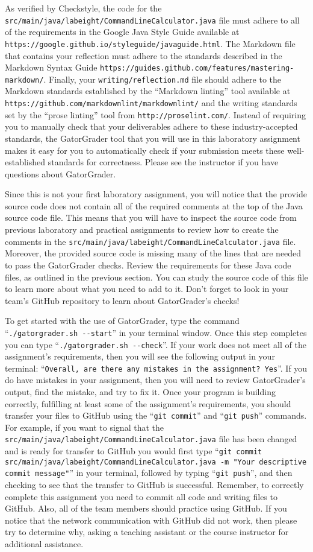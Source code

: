 \documentclass[11pt]{article}
\newcommand{\mainprogramsource}{\lstinline{src/main/java/labeight/CommandLineCalculator.java}}
\newcommand{\reflection}{\lstinline{writing/reflection.md}}
\newcommand{\gatorgraderstart}{\command{./gatorgrader.sh --start}}
\newcommand{\gatorgradercheck}{\command{./gatorgrader.sh --check}}
\newcommand{\gitcommit}{\command{git commit}}
\newcommand{\gitpush}{\command{git push}}
\newcommand{\gitcommitmainprogram}{\command{git commit src/main/java/labeight/CommandLineCalculator.java -m "Your
descriptive commit message"}}
\newcommand{\command}[1]{``\lstinline{#1}''}
\newcommand{\url}[1]{\lstinline{#1}}
\newcommand{\step}[1]{``{#1}''}
\begin{document}
As verified by Checkstyle, the code for the \mainprogramsource{} file must adhere to all of the requirements in the
Google Java Style Guide available at \url{https://google.github.io/styleguide/javaguide.html}. The Markdown file that
contains your reflection must adhere to the standards described in the Markdown Syntax Guide
\url{https://guides.github.com/features/mastering-markdown/}. Finally, your \reflection{} file should adhere to the
Markdown standards established by the \step{Markdown linting} tool available at
\url{https://github.com/markdownlint/markdownlint/} and the writing standards set by the \step{prose linting} tool from
\url{http://proselint.com/}. Instead of requiring you to manually check that your deliverables adhere to these
industry-accepted standards, the GatorGrader tool that you will use in this laboratory assignment makes it easy for you
to automatically check if your submission meets these well-established standards for correctness. Please see the
instructor if you have questions about GatorGrader.

Since this is not your first laboratory assignment, you will notice that the provide source code does not contain all of
the required comments at the top of the Java source code file. This means that you will have to inspect the source code
from previous laboratory and practical assignments to review how to create the comments in the \mainprogramsource{}
file. Moreover, the provided source code is missing many of the lines that are needed to pass the GatorGrader checks.
Review the requirements for these Java code files, as outlined in the previous section. You can study the source code of
this file to learn more about what you need to add to it. Don't forget to look in your team's GitHub repository to learn
about GatorGrader's checks!

To get started with the use of GatorGrader, type the command \gatorgraderstart{} in your terminal window. Once this step
completes you can type \gatorgradercheck{}. If your work does not meet all of the assignment's requirements, then you
will see the following output in your terminal: \command{Overall, are there any mistakes in the assignment? Yes}. If you
do have mistakes in your assignment, then you will need to review GatorGrader's output, find the mistake, and try to fix
it. Once your program is building correctly, fulfilling at least some of the assignment's requirements, you should
transfer your files to GitHub using the \gitcommit{} and \gitpush{} commands. For example, if you want to signal that
the \mainprogramsource{} file has been changed and is ready for transfer to GitHub you would first type
\gitcommitmainprogram{} in your terminal, followed by typing \gitpush{}, and then checking to see that the transfer to
GitHub is successful. Remember, to correctly complete this assignment you need to commit all code and writing files to
GitHub. Also, all of the team members should practice using GitHub. If you notice that the network communication with
GitHub did not work, then please try to determine why, asking a teaching assistant or the course instructor for
additional assistance.
\end{document}
